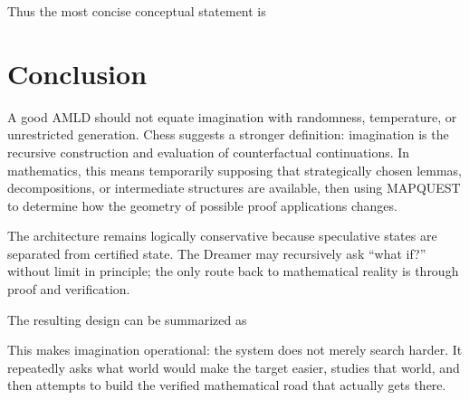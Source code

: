 \documentclass[11pt]{article}
\begin{document}
Thus the most concise conceptual statement is
\begin{center}
\end{center}

\section{Conclusion}

A good AMLD should not equate imagination with randomness, temperature, or unrestricted generation. Chess suggests a stronger definition: imagination is the recursive construction and evaluation of counterfactual continuations. In mathematics, this means temporarily supposing that strategically chosen lemmas, decompositions, or intermediate structures are available, then using MAPQUEST to determine how the geometry of possible proof applications changes.

The architecture remains logically conservative because speculative states are separated from certified state. The Dreamer may recursively ask ``what if?'' without limit in principle; the only route back to mathematical reality is through proof and verification.

The resulting design can be summarized as
\begin{center}
\end{center}

This makes imagination operational: the system does not merely search harder. It repeatedly asks what world would make the target easier, studies that world, and then attempts to build the verified mathematical road that actually gets there.
\end{document}
